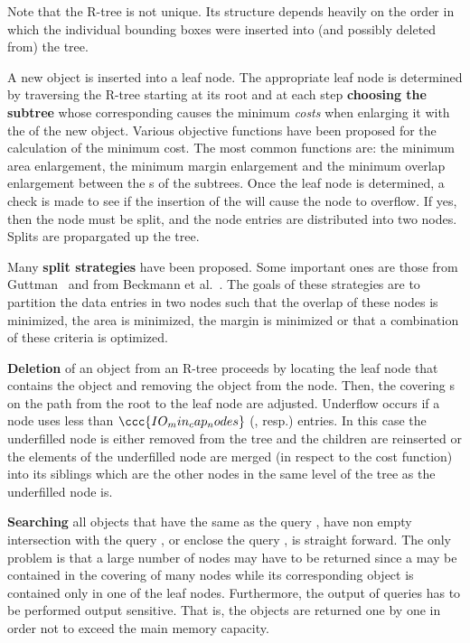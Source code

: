 Note that the R-tree is not unique. Its structure depends heavily
on the order in which the individual bounding boxes were inserted
into (and possibly deleted from) the tree.
 
A new object is inserted into a leaf node. The appropriate leaf
node  is determined by traversing the R-tree starting at its root
and at each step {\bf choosing the subtree} whose corresponding
 causes the minimum {\em costs} when enlarging it with
the  of the new object. Various objective functions have
been proposed for the calculation of the minimum cost. The most
common functions are: the minimum area enlargement, the minimum margin
enlargement and the minimum overlap enlargement between the s of the
subtrees. 
Once the leaf node is determined, a check is made to see if the
insertion of the  will cause the node to overflow. If
yes, then the node must be split, and the node entries are
distributed into two nodes. Splits are propargated
up the tree. 

Many {\bf split strategies} have been proposed. Some important ones are those from
Guttman~\cite{gutt-84} and from Beckmann et
al.~\cite{Beckmann:1990:RER}.
The goals of these strategies are to  
 partition the data entries in two
nodes such that the overlap  of these nodes is minimized, the
area is minimized, the margin is minimized or that a combination of
these criteria is optimized.  

{\bf Deletion} of an object from an R-tree proceeds by locating the
leaf node that contains the object and removing the object from the node. Then, the
covering s on the path from the root to the leaf node
are adjusted. Underflow occurs if a
node uses less than $\ccc{IO_min_cap_nodes}$
(, resp.) entries. In this case the
underfilled node is either removed from the tree and the children
are reinserted or the elements of the underfilled node are merged
(in respect to the cost function) 
into its siblings which are the other nodes in the same level of the
tree as the underfilled node is. 

{\bf Searching} all objects that have the same  as the
query , have
non empty intersection with the query , or enclose the
query , is straight forward. The only problem is that
a large number of nodes may have to be returned since a 
may be contained in the covering  of many nodes while
its corresponding object is contained only in one of the leaf
nodes.
Furthermore, the output of queries has to be performed
output sensitive. That is, the objects
are returned one by one in order not to exceed the
main memory capacity.


